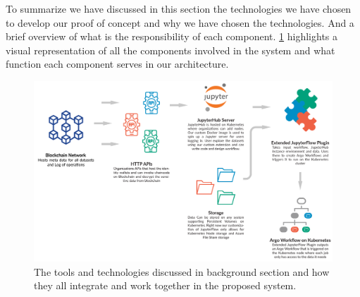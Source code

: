 To summarize we have discussed in this section the technologies we have chosen to develop our proof of concept and why we have chosen the technologies. And a brief overview of what is the responsibility of each component. \ref{fig:component-jobs} highlights a visual representation of all the components involved in the system and what function each component serves in our architecture.

\begin{figure}
    \centering
    \includegraphics[width=14cm,keepaspectratio]{photos/overview.png}
    \caption{The tools and technologies discussed in background section and how they all integrate and work together in the proposed system.}
    \label{fig:component-jobs}
\end{figure}